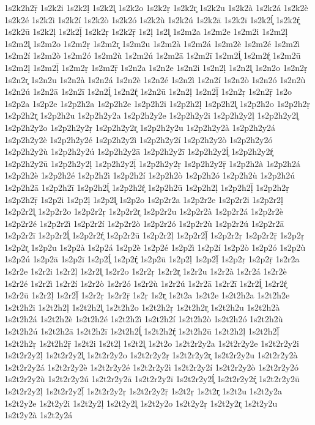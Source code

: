 {1s2k2h2ṝ
1s2k2i
1s2k2ḷ
1s2k2l̥
1s2k2o
1s2k2ṛ
1s2k2r̥
1s2k2u
1s2k2à
1s2k2á
1s2k2è
1s2k2é
1s2k2ì
1s2k2í
1s2k2ò
1s2k2ó
1s2k2ù
1s2k2ú
1s2k2ā
1s2k2ī
1s2k2ĺ̥
1s2k2ŕ̥
1s2k2ū
1s2k2ḷ
1s2k2ḹ
1s2k2ṛ
1s2k2ṝ
1s2ḷ
1s2l̥
1s2m2a
1s2m2e
1s2m2i
1s2m2ḷ
1s2m2l̥
1s2m2o
1s2m2ṛ
1s2m2r̥
1s2m2u
1s2m2à
1s2m2á
1s2m2è
1s2m2é
1s2m2ì
1s2m2í
1s2m2ò
1s2m2ó
1s2m2ù
1s2m2ú
1s2m2ā
1s2m2ī
1s2m2ĺ̥
1s2m2ŕ̥
1s2m2ū
1s2m2ḷ
1s2m2ḹ
1s2m2ṛ
1s2m2ṝ
1s2n2a
1s2n2e
1s2n2i
1s2n2ḷ
1s2n2l̥
1s2n2o
1s2n2ṛ
1s2n2r̥
1s2n2u
1s2n2à
1s2n2á
1s2n2è
1s2n2é
1s2n2ì
1s2n2í
1s2n2ò
1s2n2ó
1s2n2ù
1s2n2ú
1s2n2ā
1s2n2ī
1s2n2ĺ̥
1s2n2ŕ̥
1s2n2ū
1s2n2ḷ
1s2n2ḹ
1s2n2ṛ
1s2n2ṝ
1s2o
1s2p2a
1s2p2e
1s2p2h2a
1s2p2h2e
1s2p2h2i
1s2p2h2ḷ
1s2p2h2l̥
1s2p2h2o
1s2p2h2ṛ
1s2p2h2r̥
1s2p2h2u
1s2p2h2y2a
1s2p2h2y2e
1s2p2h2y2i
1s2p2h2y2ḷ
1s2p2h2y2l̥
1s2p2h2y2o
1s2p2h2y2ṛ
1s2p2h2y2r̥
1s2p2h2y2u
1s2p2h2y2à
1s2p2h2y2á
1s2p2h2y2è
1s2p2h2y2é
1s2p2h2y2ì
1s2p2h2y2í
1s2p2h2y2ò
1s2p2h2y2ó
1s2p2h2y2ù
1s2p2h2y2ú
1s2p2h2y2ā
1s2p2h2y2ī
1s2p2h2y2ĺ̥
1s2p2h2y2ŕ̥
1s2p2h2y2ū
1s2p2h2y2ḷ
1s2p2h2y2ḹ
1s2p2h2y2ṛ
1s2p2h2y2ṝ
1s2p2h2à
1s2p2h2á
1s2p2h2è
1s2p2h2é
1s2p2h2ì
1s2p2h2í
1s2p2h2ò
1s2p2h2ó
1s2p2h2ù
1s2p2h2ú
1s2p2h2ā
1s2p2h2ī
1s2p2h2ĺ̥
1s2p2h2ŕ̥
1s2p2h2ū
1s2p2h2ḷ
1s2p2h2ḹ
1s2p2h2ṛ
1s2p2h2ṝ
1s2p2i
1s2p2ḷ
1s2p2l̥
1s2p2o
1s2p2r2a
1s2p2r2e
1s2p2r2i
1s2p2r2ḷ
1s2p2r2l̥
1s2p2r2o
1s2p2r2ṛ
1s2p2r2r̥
1s2p2r2u
1s2p2r2à
1s2p2r2á
1s2p2r2è
1s2p2r2é
1s2p2r2ì
1s2p2r2í
1s2p2r2ò
1s2p2r2ó
1s2p2r2ù
1s2p2r2ú
1s2p2r2ā
1s2p2r2ī
1s2p2r2ĺ̥
1s2p2r2ŕ̥
1s2p2r2ū
1s2p2r2ḷ
1s2p2r2ḹ
1s2p2r2ṛ
1s2p2r2ṝ
1s2p2ṛ
1s2p2r̥
1s2p2u
1s2p2à
1s2p2á
1s2p2è
1s2p2é
1s2p2ì
1s2p2í
1s2p2ò
1s2p2ó
1s2p2ù
1s2p2ú
1s2p2ā
1s2p2ī
1s2p2ĺ̥
1s2p2ŕ̥
1s2p2ū
1s2p2ḷ
1s2p2ḹ
1s2p2ṛ
1s2p2ṝ
1s2r2a
1s2r2e
1s2r2i
1s2r2ḷ
1s2r2l̥
1s2r2o
1s2r2ṛ
1s2r2r̥
1s2r2u
1s2r2à
1s2r2á
1s2r2è
1s2r2é
1s2r2ì
1s2r2í
1s2r2ò
1s2r2ó
1s2r2ù
1s2r2ú
1s2r2ā
1s2r2ī
1s2r2ĺ̥
1s2r2ŕ̥
1s2r2ū
1s2r2ḷ
1s2r2ḹ
1s2r2ṛ
1s2r2ṝ
1s2ṛ
1s2r̥
1s2t2a
1s2t2e
1s2t2h2a
1s2t2h2e
1s2t2h2i
1s2t2h2ḷ
1s2t2h2l̥
1s2t2h2o
1s2t2h2ṛ
1s2t2h2r̥
1s2t2h2u
1s2t2h2à
1s2t2h2á
1s2t2h2è
1s2t2h2é
1s2t2h2ì
1s2t2h2í
1s2t2h2ò
1s2t2h2ó
1s2t2h2ù
1s2t2h2ú
1s2t2h2ā
1s2t2h2ī
1s2t2h2ĺ̥
1s2t2h2ŕ̥
1s2t2h2ū
1s2t2h2ḷ
1s2t2h2ḹ
1s2t2h2ṛ
1s2t2h2ṝ
1s2t2i
1s2t2ḷ
1s2t2l̥
1s2t2o
1s2t2r2y2a
1s2t2r2y2e
1s2t2r2y2i
1s2t2r2y2ḷ
1s2t2r2y2l̥
1s2t2r2y2o
1s2t2r2y2ṛ
1s2t2r2y2r̥
1s2t2r2y2u
1s2t2r2y2à
1s2t2r2y2á
1s2t2r2y2è
1s2t2r2y2é
1s2t2r2y2ì
1s2t2r2y2í
1s2t2r2y2ò
1s2t2r2y2ó
1s2t2r2y2ù
1s2t2r2y2ú
1s2t2r2y2ā
1s2t2r2y2ī
1s2t2r2y2ĺ̥
1s2t2r2y2ŕ̥
1s2t2r2y2ū
1s2t2r2y2ḷ
1s2t2r2y2ḹ
1s2t2r2y2ṛ
1s2t2r2y2ṝ
1s2t2ṛ
1s2t2r̥
1s2t2u
1s2t2y2a
1s2t2y2e
1s2t2y2i
1s2t2y2ḷ
1s2t2y2l̥
1s2t2y2o
1s2t2y2ṛ
1s2t2y2r̥
1s2t2y2u
1s2t2y2à
1s2t2y2á
}

